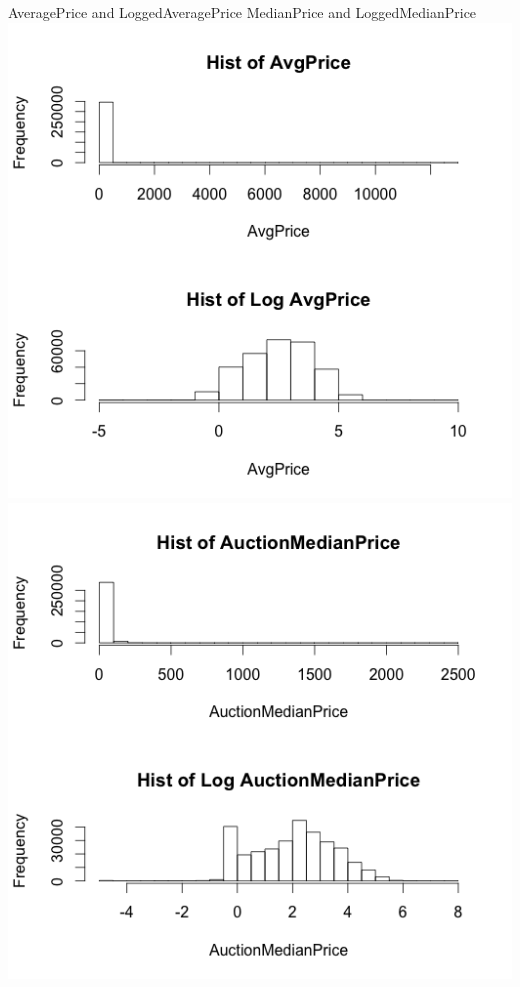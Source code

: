 \documentclass[CEJM,PDF]{cej} %
\begin{document}
{\centering
    AveragePrice and LoggedAveragePrice\hspace*{8em} MedianPrice and LoggedMedianPrice
    \vspace{3 mm}
    \includegraphics[scale=0.4]{ap.png}\hspace*{2em}
    \includegraphics[scale=0.4]{amp.png}
    \par
}
\end{document}
